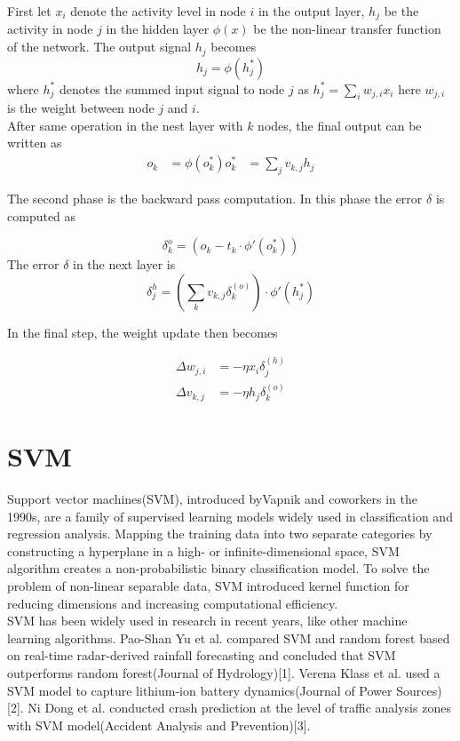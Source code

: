 \documentclass{kththesis}
\begin{document}
First let $x_{i}$ denote the activity level in node $i$ in the output layer, $h_{j}$ be the activity in node $j$ in the hidden layer $\phi(x)$ be the non-linear transfer function of the network. The output signal $h_{j}$ becomes
\begin{equation}
h_{j}=\phi(h^{*}_{j})
\end{equation}
where $h^{*}_{j}$ denotes the summed input signal to node $j$ as $h^{*}_{j}=\sum_{i}w_{j,i}x_{i}$ here $w_{j,i}$ is the weight between node $j$ and $i$.\\
After same operation in the nest layer with $k$ nodes, the final output can be written as
\begin{align}
o_{k}&=\phi(o^{*}_{k})
o^{*}_{k}&=\sum_{j}v_{k,j}h_{j}
\end{align}

The second phase is the backward pass computation. In this phase the error $\delta$ is computed as

\begin{equation}
\delta^{o}_{k}=(o_{k}-t_{k}\cdot \phi'(o^{*}_{k}))
\end{equation}
The error $\delta$ in the next layer is
\begin{equation}
\delta^{h}_{j}=\left(\sum_{k}v_{k,j}\delta^{(o)}_{k}\right)\cdot \phi'(h^{*}_{j})
\end{equation}

In the final step, the weight update then becomes

\begin{align}
\Delta w_{j,i}&=-\eta x_{i}\delta^{(h)}_{j}\\
\Delta v_{k,j}&=-\eta h_{j}\delta^{(o)}_{k}
\end{align}


\section{SVM}
Support vector machines(SVM), introduced byVapnik and coworkers in the 1990s, are a family of supervised learning models widely used in classification and regression analysis. Mapping the training data into two separate categories by constructing a hyperplane in a high- or infinite-dimensional space, SVM algorithm creates a non-probabilistic binary classification model. To solve the problem of non-linear separable data, SVM introduced kernel function for reducing dimensions and increasing computational efficiency. \\
SVM has been widely used in research in recent years, like other machine learning algorithms. Pao-Shan Yu et al. compared SVM and random forest based on real-time radar-derived rainfall forecasting and concluded that SVM outperforms random forest(Journal of Hydrology)[1]. Verena Klass et al. used a SVM model to capture lithium-ion battery dynamics(Journal of Power Sources)[2]. Ni Dong et al. conducted crash prediction at the level of traffic
analysis zones with SVM model(Accident Analysis and Prevention)[3].
\end{document}
